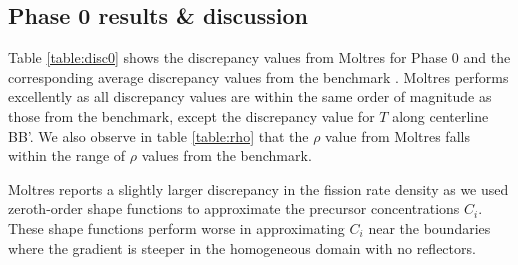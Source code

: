\subsection{Phase 0 results \& discussion}

Table \ref{table:disc0} shows the discrepancy values from Moltres for Phase 0
and the corresponding average discrepancy values from the benchmark
\citep{tiberga_results_2020}. Moltres performs excellently as all discrepancy
values are within the same order of magnitude as those from the benchmark,
except the discrepancy value for $T$ along centerline BB'. We also observe in
table \ref{table:rho} that the $\rho$ value from Moltres falls within the
range of $\rho$ values from the benchmark.

Moltres reports a slightly larger discrepancy in the fission rate density as
we used zeroth-order shape functions to approximate the precursor
concentrations $C_i$. These shape functions perform worse in approximating
$C_i$ near the boundaries where the gradient is steeper in the homogeneous
domain with no reflectors.

